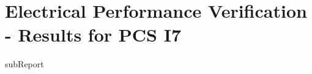 \renewcommand{\DTRPcs}{I7} %
\renewcommand{\DTRPcsLong}{I7}


    \section{Electrical Performance Verification - Results for PCS \DTRPcsLong}

    {{subReport}}
    \newpage


